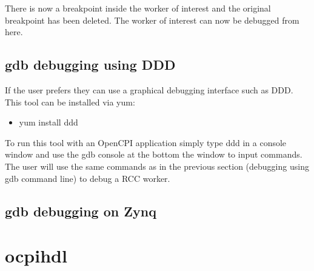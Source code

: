 \begin{flushleft}
There is now a breakpoint inside the worker of interest and the original breakpoint has been deleted.  The worker of interest can now be debugged from here.

\subsection{gdb debugging using DDD}
	If the user prefers they can use a graphical debugging interface such as DDD.  This tool can be installed via yum:
	\begin{itemize}
	    \item yum install ddd
	\end{itemize}
To run this tool with an OpenCPI application simply type ddd in a console window and use the gdb console at the bottom the window to input commands.  The user will use the same commands as in the previous section (debugging using gdb command line) to debug a RCC worker.

\subsection{gdb debugging on Zynq}




\end{flushleft}
\section{ocpihdl}
